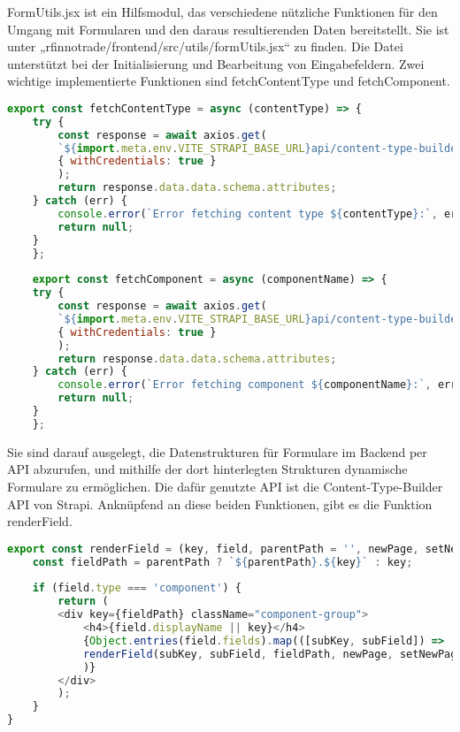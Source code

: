 FormUtils.jsx ist ein Hilfsmodul, das verschiedene nützliche Funktionen für den Umgang mit Formularen und den daraus resultierenden Daten bereitstellt. Sie ist unter „rfinnotrade/frontend/src/utils/formUtils.jsx“ zu finden. Die Datei unterstützt bei der Initialisierung und Bearbeitung von Eingabefeldern.
Zwei wichtige implementierte Funktionen sind fetchContentType und fetchComponent.

\begin{lstlisting}[language=JavaScript, caption={formutils.jsx fetch-Funktionen}, label={lst:formutilsjsxFetchFunktionen}]
export const fetchContentType = async (contentType) => {
    try {
        const response = await axios.get(
        `${import.meta.env.VITE_STRAPI_BASE_URL}api/content-type-builder/content-types/${contentType}?populate=*`,
        { withCredentials: true }
        );
        return response.data.data.schema.attributes;
    } catch (err) {
        console.error(`Error fetching content type ${contentType}:`, err);
        return null;
    }
    };
    
    export const fetchComponent = async (componentName) => {
    try {
        const response = await axios.get(
        `${import.meta.env.VITE_STRAPI_BASE_URL}api/content-type-builder/components/${componentName}?populate=*`,
        { withCredentials: true }
        );
        return response.data.data.schema.attributes;
    } catch (err) {
        console.error(`Error fetching component ${componentName}:`, err);
        return null;
    }
    };
\end{lstlisting}

Sie sind darauf ausgelegt, die Datenstrukturen für Formulare im Backend per API abzurufen, und mithilfe der dort hinterlegten Strukturen dynamische Formulare zu ermöglichen. Die dafür genutzte API ist die Content-Type-Builder API von Strapi.
Anknüpfend an diese beiden Funktionen, gibt es die Funktion renderField.

\begin{lstlisting}[language=JavaScript, caption={formutils.jsx renderField-Funktion}, label={lst:formutilsjsxRenderFieldFunktion}]
export const renderField = (key, field, parentPath = '', newPage, setNewPage, setError, isEditing = false) => {
    const fieldPath = parentPath ? `${parentPath}.${key}` : key;
    
    if (field.type === 'component') {
        return (
        <div key={fieldPath} className="component-group">
            <h4>{field.displayName || key}</h4>
            {Object.entries(field.fields).map(([subKey, subField]) => 
            renderField(subKey, subField, fieldPath, newPage, setNewPage, setError, isEditing)
            )}
        </div>
        );
    }
}
\end{lstlisting}

